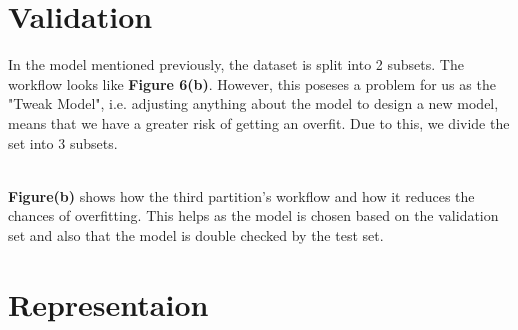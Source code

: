 \documentclass[12pt]{article}
\begin{document}
\section{Validation}
In the model mentioned previously, the dataset is split into 2 subsets. The workflow looks like \textbf{Figure 6(b)}. However, this poseses a problem for us as the "Tweak Model", i.e. adjusting anything about the model to design a new model, means that we have a greater risk of getting an overfit. Due to this, we divide the set into 3 subsets.
\begin{figure}[h!]%
    \centering
    \qquad
    \caption{}%
\end{figure}
\\\textbf{Figure(b)} shows how the third partition's workflow and how it reduces the chances of overfitting. 
This helps as the model is chosen based on the validation set and also that the model is double checked by the test set.
\section{Representaion}
\end{document}
